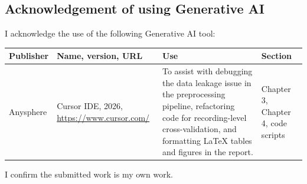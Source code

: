 \subsection*{Acknowledgement of using Generative AI}
{}
\setlength{\tabcolsep}{0.1cm}

I acknowledge the use of the following Generative AI tool:

\begin{table}[h]
    \renewcommand{\arraystretch}{1.3}
    {\small
    \begin{tabular}{|>{\raggedright\arraybackslash}p{1.8cm}|>{\raggedright\arraybackslash}p{4.0cm}|>{\raggedright\arraybackslash}p{5.6cm}|>{\raggedright\arraybackslash}p{2.8cm}|}
        \hline
        \textbf{Publisher} & \textbf{Name, version, URL} & \textbf{Use} & \textbf{Section} \\
        \hline
        Anysphere & Cursor IDE, 2026, \url{https://www.cursor.com/} & To assist with debugging the data leakage issue in the preprocessing pipeline, refactoring code for recording-level cross-validation, and formatting LaTeX tables and figures in the report. & Chapter 3, Chapter 4, code scripts \\
        \hline
    \end{tabular}
    }
\end{table}

\noindent I confirm the submitted work is my own work.
